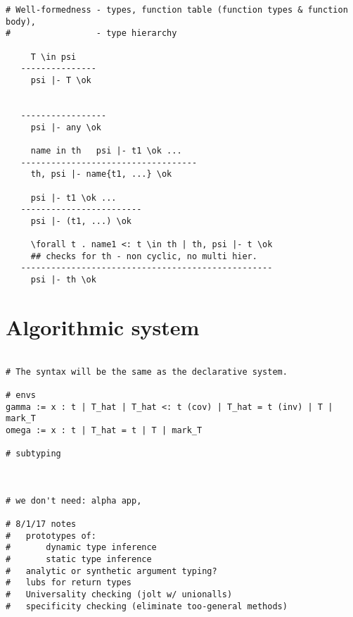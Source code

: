 \documentclass{report} %
\begin{document}
\begin{verbatim}
# Well-formedness - types, function table (function types & function body),
#                 - type hierarchy

     T \in psi
   ---------------
     psi |- T \ok

     
   -----------------
     psi |- any \ok

     name in th   psi |- t1 \ok ...
   -----------------------------------
     th, psi |- name{t1, ...} \ok

     psi |- t1 \ok ...
   ------------------------
     psi |- (t1, ...) \ok 

     \forall t . name1 <: t \in th | th, psi |- t \ok 
     ## checks for th - non cyclic, no multi hier.
   --------------------------------------------------
     psi |- th \ok 

\end{verbatim}

\section*{Algorithmic system}

\begin{verbatim}

# The syntax will be the same as the declarative system.

# envs
gamma := x : t | T_hat | T_hat <: t (cov) | T_hat = t (inv) | T | mark_T 
omega := x : t | T_hat = t | T | mark_T

# subtyping



# we don't need: alpha app, 

# 8/1/17 notes
#   prototypes of:
#       dynamic type inference
#       static type inference
#   analytic or synthetic argument typing?
#   lubs for return types
#   Universality checking (jolt w/ unionalls) 
#   specificity checking (eliminate too-general methods)

\end{verbatim}
\end{document}
